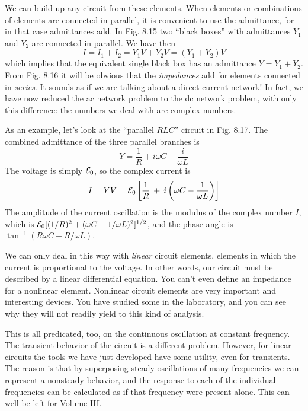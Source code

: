 We can build up any circuit from these elements. When elements
or combinations of elements are connected in parallel, it is convenient
to use the admittance, for in that case admittances add. In Fig. 8.15
two ``black boxes'' with admittances $Y_1$ and $Y_2$ are connected in
parallel. We have then
\begin{equation}
  I = I_1+I_2 = Y_1V+Y_2V = (Y_1+Y_2)V
\end{equation}
which implies that the equivalent single black box has an admittance
$Y = Y_1 + Y_2$. From Fig. 8.16 it will be obvious that the \emph{impedances}
add for elements connected in \emph{series}. It sounds as if we are talking
about a direct-current network! In fact, we have now reduced the
ac network problem to the dc network problem, with only this 
difference: the numbers we deal with are complex numbers.

As an example, let's look at the ``parallel $RLC$'' circuit in
Fig. 8.17. The combined admittance of the three parallel branches is
\begin{equation}
  Y = \frac{1}{R} + i\omega C - \frac{i}{\omega L}
\end{equation}
The voltage is simply $\mathcal{E}_0$, so the complex current is
\begin{equation}
  I = YV = \mathcal{E}_0\left[\frac{1}{R} \: + \: i\left(\omega C-\frac{1}{\omega L}\right)\right]
\end{equation}
The amplitude of the current oscillation is the modulus of the complex
number $I$, which is $\mathcal{E}_0 [(1/R)^2 + (\omega C - 1/\omega L)^2]^{1/2}$, and the
phase angle is $\tan^{-1} (R\omega C - R/\omega L)$.

We can only deal in this way with \emph{linear} circuit elements, elements
in which the current is proportional to the voltage. In other words,
our circuit must be described by a linear differential equation. You
can't even define an impedance for a nonlinear element. Nonlinear
circuit elements are very important and interesting devices. You
have studied some in the laboratory, and you can see why they will
not readily yield to this kind of analysis.

This is all predicated, too, on the continuous oscillation at constant
frequency. The transient behavior of the circuit is a different
problem. However, for linear circuits the tools we have just developed
have some utility, even for transients. The reason is that by
superposing steady oscillations of many frequencies we can represent
a nonsteady behavior, and the response to each of the individual
frequencies can be calculated as if that frequency were present alone.
This can well be left for Volume III.

